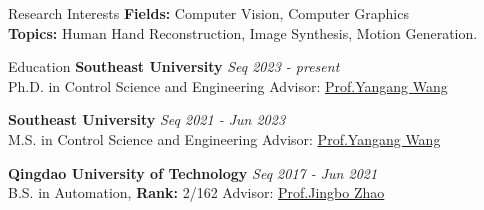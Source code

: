 \documentclass{template_2311} %
\begin{document}
\begin{rSection}{Research Interests}
    {\bf Fields:} Computer Vision, Computer Graphics \\
    {\bf Topics:} Human Hand Reconstruction, Image Synthesis, Motion Generation.
\end{rSection}

\begin{rSection}{Education}
{\bf Southeast University} \hfill {\em Seq 2023 - present} 
\\ Ph.D. in Control Science and Engineering \hfill {Advisor: \href{https://www.yangangwang.com/}{Prof.Yangang Wang}}

{\bf Southeast University} \hfill {\em Seq 2021 - Jun 2023} 
\\ M.S. in Control Science and Engineering \hfill {Advisor: \href{https://www.yangangwang.com/}{Prof.Yangang Wang}}

{\bf Qingdao University of Technology} \hfill {\em Seq 2017 - Jun 2021} 
\\ B.S. in Automation, {\bf Rank:} 2/162  \hfill {Advisor: \href{https://ice.qut.edu.cn/info/1017/4137.htm}{Prof.Jingbo Zhao}}
\end{rSection}
\end{document}
